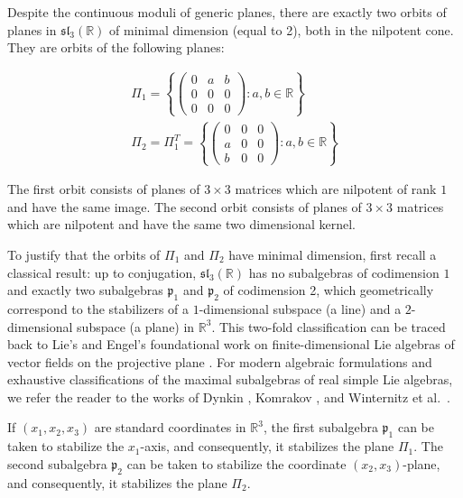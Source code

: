 \documentclass[11pt,letterpaper]{amsart}
\numberwithin{equation}{section}
\begin{document}
Despite the continuous moduli of generic planes, there are exactly two orbits of planes in $\mathfrak{sl}_3(\mathbb{R})$ of minimal dimension (equal to 2), both in the nilpotent cone. They are orbits of the following planes:

\begin{align}
\Pi_1=\left\{\begin{pmatrix}0&a&b\\0&0&0\\0&0&0\end{pmatrix}: a,b\in \mathbb R  \right\}\label{plane_1}\\
\Pi_2=\Pi_1^T=\left\{\begin{pmatrix}0&0&0\\a&0&0\\b&0&0\end{pmatrix}: a,b\in \mathbb R  \right\}\label{plane_2}
\end{align}

The first orbit consists of planes of $3\times 3$ matrices which are nilpotent of rank $1$ and have the same image. The second orbit consists  of planes of $3\times 3$ matrices which are nilpotent and have the same two dimensional kernel. 

To justify that the orbits of $\Pi_1$ and $\Pi_2$ have minimal dimension, first recall a classical result: up to conjugation, $\mathfrak{sl}_3(\mathbb R)$ has no subalgebras of codimension $1$ and exactly two subalgebras $\mathfrak{p}_1$ and $\mathfrak{p}_2$ of codimension 2, which geometrically correspond to the stabilizers of a $1$-dimensional subspace (a line) and a $2$-dimensional subspace (a plane) in $\mathbb{R}^3$. This two-fold classification can be traced back to Lie's  and Engel's foundational work on finite-dimensional Lie algebras of vector fields on the projective plane \cite{Lie1893}. For modern algebraic formulations and exhaustive classifications of the maximal subalgebras of real simple Lie algebras, we refer the reader to the works of Dynkin \cite{Dynkin1952}, Komrakov \cite{Komrakov1990}, and Winternitz et al.\ \cite{Winternitz}.

If $(x_1, x_2, x_3)$ are standard coordinates in $\mathbb{R}^3$, the first subalgebra $\mathfrak{p}_1$ can be taken to stabilize the $x_1$-axis, and consequently, it stabilizes the plane $\Pi_1$. The second subalgebra $\mathfrak{p}_2$ can be taken to stabilize the coordinate $(x_2, x_3)$-plane, and consequently, it stabilizes the plane $\Pi_2$.
\end{document}
